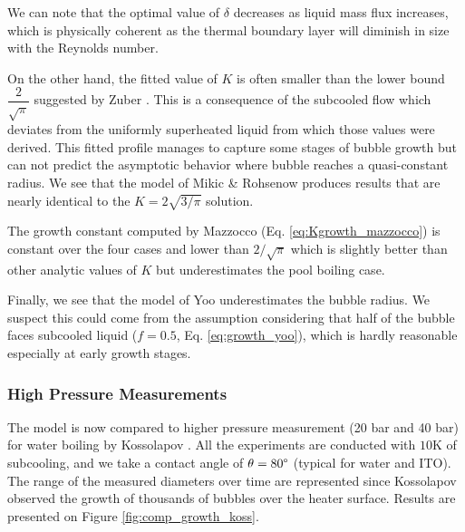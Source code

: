 \begin{remark*}{}
We can note that the optimal value of $\delta$ decreases as liquid mass flux increases, which is physically coherent as the thermal boundary layer will diminish in size with the Reynolds number.
\end{remark*}

\npar

On the other hand, the fitted value of $K$ is often smaller than the lower bound $\dfrac{2}{\sqrt{\pi}}$ suggested by Zuber \cite{zuber_dynamics_1961}. This is a consequence of the subcooled flow which deviates from the uniformly superheated liquid from which those values were derived. This fitted profile manages to capture some stages of bubble growth but can not predict the asymptotic behavior where bubble reaches a quasi-constant radius. We see that the model of Mikic \& Rohsenow produces results that are nearly identical to the $K=2\sqrt{3/\pi}$ solution.


The growth constant computed by Mazzocco \etal (Eq. \ref{eq:Kgrowth_mazzocco}) is constant over the four cases and lower than $2/\sqrt{\pi}$ which is slightly better than other analytic values of $K$ but underestimates the pool boiling case.


\npar

Finally, we see that the model of Yoo \etal underestimates the bubble radius. We suspect this could come from the assumption considering that half of the bubble faces subcooled liquid ($f=0.5$, Eq. \ref{eq:growth_yoo}), which is hardly reasonable especially at early growth stages.



\subsubsection{High Pressure Measurements}

The model is now compared to higher pressure measurement (20 bar and 40 bar) for water boiling by Kossolapov \cite{kossolapov_experimental_2021}. All the experiments are conducted with $10$K of subcooling, and we take a contact angle of $\theta=80\degree$ (typical for water and ITO). The range of the measured diameters over time are represented since Kossolapov observed the growth of thousands of bubbles over the heater surface. Results are presented on Figure \ref{fig:comp_growth_koss}.



